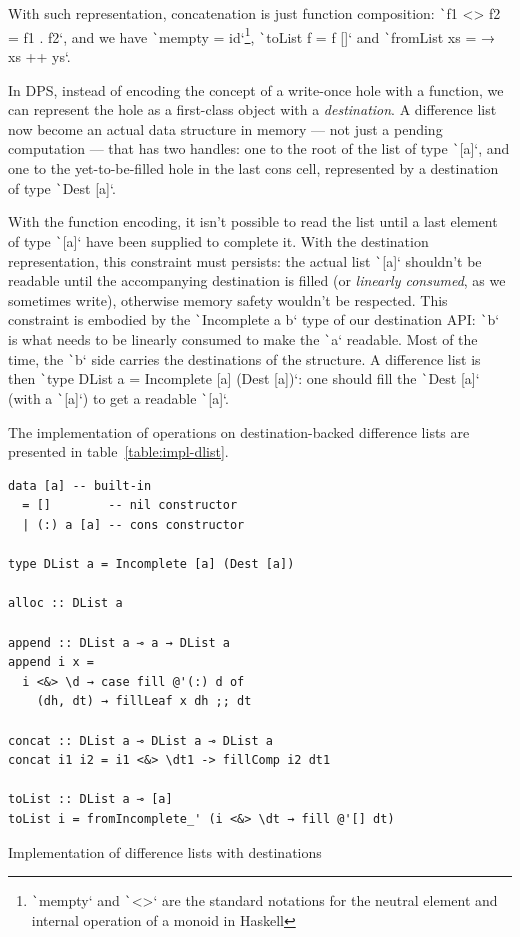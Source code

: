 \documentclass[english]{jflart}
\begin{document}
With such representation, concatenation is just function composition: \texttt`f1 <> f2 = f1 . f2`, and we have \texttt`mempty = id`\footnote{\texttt`mempty` and \texttt`<>` are the standard notations for the neutral element and internal operation of a monoid in Haskell}, \texttt`toList f = f []` and \texttt`fromList xs = \ys → xs ++ ys`.

In DPS, instead of encoding the concept of a write-once hole with a function, we can represent the hole as a first-class object with a \emph{destination}. A difference list now become an actual data structure in memory --- not just a pending computation --- that has two handles: one to the root of the list of type \texttt`[a]`, and one to the yet-to-be-filled hole in the last cons cell, represented by a destination of type \texttt`Dest [a]`.

With the function encoding, it isn't possible to read the list until a last element of type \texttt`[a]` have been supplied to complete it. With the destination representation, this constraint must persists: the actual list \texttt`[a]` shouldn't be readable until the accompanying destination is filled (or \emph{linearly consumed}, as we sometimes write), otherwise memory safety wouldn't be respected. This constraint is embodied by the \texttt`Incomplete a b` type of our destination API: \texttt`b` is what needs to be linearly consumed to make the \texttt`a` readable. Most of the time, the \texttt`b` side carries the destinations of the structure. A difference list is then \texttt`type DList a = Incomplete [a] (Dest [a])`: one should fill the \texttt`Dest [a]` (with a \texttt`[a]`) to get a readable \texttt`[a]`.

The implementation of operations on destination-backed difference lists are presented in table~\ref{table:impl-dlist}.
\begin{table}[t]
\small
\begin{verbatim}
data [a] -- built-in
  = []        -- nil constructor
  | (:) a [a] -- cons constructor

type DList a = Incomplete [a] (Dest [a])

alloc :: DList a

append :: DList a ⊸ a → DList a
append i x =
  i <&> \d → case fill @'(:) d of
    (dh, dt) → fillLeaf x dh ;; dt

concat :: DList a ⊸ DList a ⊸ DList a
concat i1 i2 = i1 <&> \dt1 -> fillComp i2 dt1

toList :: DList a ⊸ [a]
toList i = fromIncomplete_' (i <&> \dt → fill @'[] dt)
\end{verbatim}
\caption{Implementation of difference lists with destinations}
\label{table:impl-dlist}
\end{table}
\end{document}

